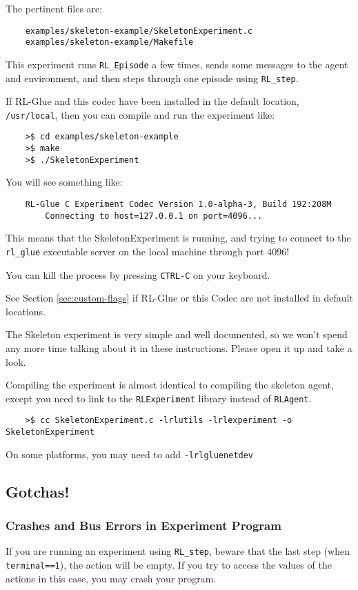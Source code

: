 \documentclass[11pt]{article}
\begin{document}
The pertinent files are:
\begin{verbatim}
	examples/skeleton-example/SkeletonExperiment.c
	examples/skeleton-example/Makefile
\end{verbatim}

This experiment runs \texttt{RL\_Episode} a few times, sends some messages to the agent and environment, and then steps through one episode using \texttt{RL\_step}.

If RL-Glue and this codec have been installed in the default location, \texttt{/usr/local}, then you can compile and run the experiment like:
\begin{verbatim}
	>$ cd examples/skeleton-example
	>$ make
	>$ ./SkeletonExperiment
\end{verbatim}

You will see something like:
\begin{verbatim}
	RL-Glue C Experiment Codec Version 1.0-alpha-3, Build 192:208M
		Connecting to host=127.0.0.1 on port=4096...
\end{verbatim}

This means that the SkeletonExperiment is running, and trying to connect to the \texttt{rl\_glue} executable server on the local machine through port $4096$!  

You can kill the process by pressing \texttt{CTRL-C} on your keyboard.

See Section \ref{sec:custom-flags} if RL-Glue or this Codec are not installed in default locations.

The Skeleton experiment is very simple and well documented, so we won't spend any more time talking about it in these instructions.
Please open it up and take a look.


Compiling the experiment is almost identical to compiling the skeleton agent, except you need to link to the \texttt{RLExperiment} library instead of \texttt{RLAgent}.
\begin{verbatim}
	>$ cc SkeletonExperiment.c -lrlutils -lrlexperiment -o SkeletonExperiment
\end{verbatim}

On some platforms, you may need to add \texttt{-lrlgluenetdev}


\subsection{Gotchas!}
\subsubsection{Crashes and Bus Errors in Experiment Program}
If you are running an experiment using \texttt{RL\_step}, beware that the last step (when \texttt{terminal==1}), the action will be empty.  If you try to access the values of the actions in this 
case, you may crash your program.
\end{document}
